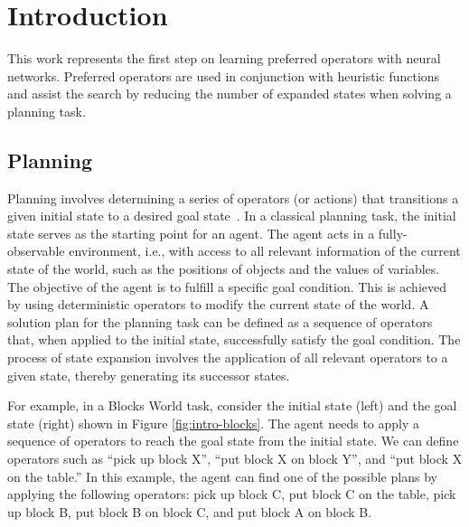 \documentclass[ppgc,diss,english]{iiufrgs}
\begin{document}
\listoffigures

\listoftables

\listofalgorithms

\tableofcontents

%
%
\chapter{Introduction}
\label{cha:introduction}
This work represents the first step on learning preferred operators with neural networks. Preferred operators are used in conjunction with heuristic functions and assist the search by reducing the number of expanded states when solving a planning task.

\section{Planning}
\label{sec:intro-planning}
Planning involves determining a series of operators (or actions) that transitions a given initial state to a desired goal state~\cite{Lipovetsky/2014}.
In a classical planning task, the initial state serves as the starting point for an agent. The agent acts in a fully-observable environment, i.e., with access to all relevant information of the current state of the world, such as the positions of objects and the values of variables. The objective of the agent is to fulfill a specific goal condition. This is achieved by using deterministic operators to modify the current state of the world. A solution plan for the planning task can be defined as a sequence of operators that, when applied to the initial state, successfully satisfy the goal condition. The process of state expansion involves the application of all relevant operators to a given state, thereby generating its successor states.

For example, in a Blocks World task, consider the initial state (left) and the goal state (right) shown in Figure \ref{fig:intro-blocks}. The agent needs to apply a sequence of operators to reach the goal state from the initial state. We can define operators such as ``pick up block X'', ``put block X on block Y'', and ``put block X on the table.'' In this example, the agent can find one of the possible plans by applying the following operators: pick up block C, put block C on the table, pick up block B, put block B on block C, and put block A on block B.
\end{document}

